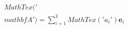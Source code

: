 \documentclass[preview]{standalone}
\begin{document}
\begin{align*}
MathTex('\\mathbf{A}') = \sum_{i=1}^3 MathTex('a_i') \mathbf{e}_i
\end{align*}
\end{document}
